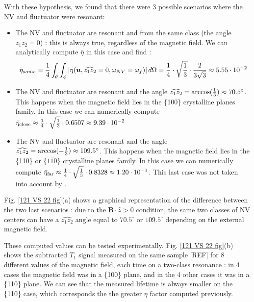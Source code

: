 \documentclass[preprintnumbers,amsmath,amssymb,onecolumn,12pt]{revtex4-2}\usepackage{graphicx}%
\begin{document}
With these hypothesis, we found that there were 3 possible scenarios where the NV and fluctuator were resonant:
\begin{itemize}
\item The NV and fluctuator are resonant and from the same class (the angle $\widehat{z_1 z_2}=0$) : this is always true, regardless of the magnetic field. We can analytically compute $\bar \eta$ in this case and find : $$ \bar {\eta}_{same}=\frac{1}{4}  \int_\theta \int_\phi \abs{\eta(\bm u,\widehat{z_1 z_2}=0,\omega_{NV}=\omega_f)}\, d\Omega= \frac{1}{4} \cdot \sqrt{\frac{1}{3}} \cdot \frac{2}{3 \sqrt{3}} \approx 5.55\cdot10^{-2}$$
\item The NV and fluctuator are resonant and the angle $\widehat{z_1 z_2}=\rm{arccos}(\frac{1}{3})\approx 70.5^\circ$. This happens when the magnetic field lies in the \{100\} crystalline planes family. In this case we can numerically compute $\bar \eta_{\rm close} \approx \frac{1}{4} \cdot \sqrt{\frac{1}{3}} \cdot 0.6507 \approx 9.39\cdot10^{-2}$
\item The NV and fluctuator are resonant and the angle $\widehat{z_1 z_2}=\rm{arccos}(-\frac{1}{3})\approx 109.5^\circ$. This happens when the magnetic field lies in the \{110\} or \{$1\bar{1}0$\} crystalline planes family. In this case we can numerically compute $\bar \eta_{\rm far} \approx \frac{1}{4} \cdot \sqrt{\frac{1}{3}} \cdot 0.8328 \approx 1.20\cdot10^{-1}$. This last case was not taken into account by \cite{choi_depolarization_2017}.
\end{itemize}



Fig. \ref{121 VS 22 fig}(a) shows a graphical representation of the difference between the two last scenarios : due to the $\bm{B}\cdot \hat{z} >0$ condition, the same two classes of NV centers can have a $\widehat{z_1 z_2}$ angle equal to $70.5^\circ$ or $109.5^\circ$ depending on the external magnetic field. 

These computed values can be tested experimentally. Fig. \ref{121 VS 22 fig}(b) shows the subtracted $T_1$ signal measured on the same sample [REF] for 8 different values of the magnetic field, each time on a two-class resonance : in 4 cases the magnetic field was in a \{100\} plane, and in the 4 other cases it was in a \{110\} plane. We can see that the measured lifetime is always smaller on the \{110\} case, which corresponds the the greater $\bar \eta$ factor computed previously.
\end{document}
